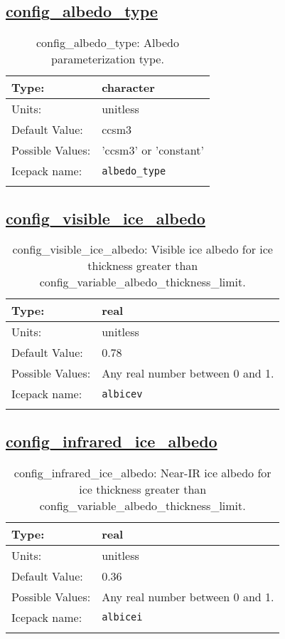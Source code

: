 \subsection[config\_albedo\_type]{\hyperref[sec:nm_tab_shortwave]{config\_albedo\_type}}
\label{subsec:nm_sec_config_albedo_type}
\begin{center}
\begin{longtable}{| p{2.0in} || p{4.0in} |}
    \hline
    Type: & character \\
    \hline
    Units: & \si{unitless} \\
    \hline
    Default Value: & ccsm3 \\
    \hline
    Possible Values: & 'ccsm3' or 'constant' \\
    \hline
    Icepack name: & \verb+albedo_type+ \\
    \hline
    \caption{config\_albedo\_type: Albedo parameterization type.}
\end{longtable}
\end{center}
\subsection[config\_visible\_ice\_albedo]{\hyperref[sec:nm_tab_shortwave]{config\_visible\_ice\_albedo}}
\label{subsec:nm_sec_config_visible_ice_albedo}
\begin{center}
\begin{longtable}{| p{2.0in} || p{4.0in} |}
    \hline
    Type: & real \\
    \hline
    Units: & \si{unitless} \\
    \hline
    Default Value: & 0.78 \\
    \hline
    Possible Values: & Any real number between 0 and 1. \\
    \hline
    Icepack name: & \verb+albicev+ \\
    \hline
    \caption{config\_visible\_ice\_albedo: Visible ice albedo for ice thickness greater than config\_variable\_albedo\_thickness\_limit.}
\end{longtable}
\end{center}
\subsection[config\_infrared\_ice\_albedo]{\hyperref[sec:nm_tab_shortwave]{config\_infrared\_ice\_albedo}}
\label{subsec:nm_sec_config_infrared_ice_albedo}
\begin{center}
\begin{longtable}{| p{2.0in} || p{4.0in} |}
    \hline
    Type: & real \\
    \hline
    Units: & \si{unitless} \\
    \hline
    Default Value: & 0.36 \\
    \hline
    Possible Values: & Any real number between 0 and 1. \\
    \hline
    Icepack name: & \verb+albicei+ \\
    \hline
    \caption{config\_infrared\_ice\_albedo: Near-IR ice albedo for ice thickness greater than config\_variable\_albedo\_thickness\_limit.}
\end{longtable}
\end{center}

